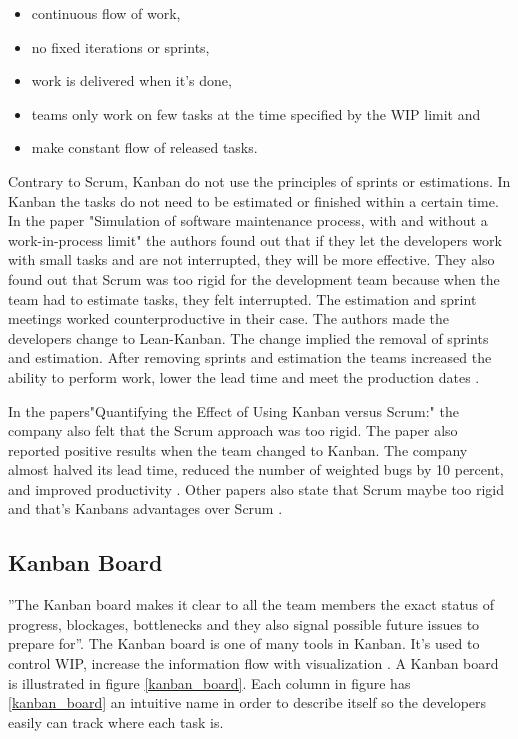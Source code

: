 \documentclass[UKenglish]{ifimaster}  %
\begin{document}
\begin{itemize}
\item continuous flow of work,
\item	no fixed iterations or sprints,
\item work is delivered when it's done,
\item teams only work on few tasks at the time specified by the WIP limit and
\item make constant flow of released tasks.
\end{itemize}


Contrary to Scrum, Kanban do not use the principles of sprints or estimations. In Kanban the tasks do not need to be estimated or finished within a certain time. In the paper "Simulation of software maintenance process, with and without a work-in-process limit" \parencite{SMR:SMR1599} the authors found out that if they let the developers work with small tasks and are not interrupted, they will be more effective. They also found out that Scrum was too rigid for the development team because when the team had to estimate tasks, they felt interrupted.  The estimation and sprint meetings worked counterproductive in their case. The authors made the developers change to Lean-Kanban.  The change implied the removal of sprints and estimation. After removing sprints and estimation the teams increased the ability to perform work, lower the lead time and meet the production dates \parencite{SMR:SMR1599}.

In the papers"Quantifying the Effect of Using Kanban versus Scrum:" the company also felt that the Scrum approach was too rigid. The paper also reported positive results when the team changed to Kanban.  The company almost halved its lead time, reduced the number of weighted bugs by 10 percent, and improved productivity \parencite{Dag}. Other papers also state that Scrum maybe too rigid and that's Kanbans advantages over Scrum \parencite{beedle1999scrum} \parencite{brekkanintroducing} .  

\subsection {Kanban Board}
''The Kanban board makes it clear to all the team members the exact status of progress, blockages, bottlenecks and they also signal possible future issues to prepare for''\parencite{Joyce}.  The Kanban board is one of many tools in Kanban. It's used to control WIP, increase the information flow with visualization \parencite{SMR:SMR1599}. A Kanban board is illustrated in figure \ref{kanban_board}. Each column in figure has \ref{kanban_board} an intuitive name in order to describe itself so the developers easily can track where each task is. 
\end{document}
